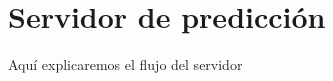 \cleardoublepage

\chapter{Servidor de predicción}
\label{makereference5}

Aquí explicaremos el flujo del servidor

